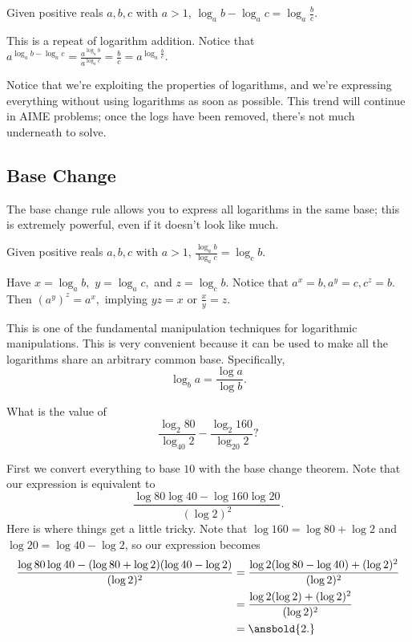 \begin{theo}
Given positive reals $a,b,c$ with $a > 1$, $\log_{a}b-\log_{a}c=\log_{a}{\frac{b}{c}}.$
\end{theo}

\begin{pro}
This is a repeat of logarithm addition. Notice that $a^{\log_ab-\log_ac}=\frac{a^{\log_ab}}{ a^{\log_ac}}=\frac{b}{c}=a^{\log_a\frac{b}{c}}.$
\end{pro}

Notice that we're exploiting the properties of logarithms, and we're expressing everything without using logarithms as soon as possible. This trend will continue in AIME problems; once the logs have been removed, there's not much underneath to solve.

\subsection{Base Change}
The base change rule allows you to express all logarithms in the same base; this is extremely powerful, even if it doesn't look like much.

\begin{theo}
Given positive reals $a,b,c$ with $a > 1$, $\frac{\log_{a}b}{\log_{a}c}=\log_{c}b.$
\end{theo}

\begin{pro}
Have $x=\log_ab,$ $y=\log_ac,$ and $z=\log_cb.$ Notice that $a^x=b,a^y=c,c^z=b.$ Then $(a^y)^z=a^x,$ implying $yz=x$ or $\frac{x}{y}=z.$
\end{pro}

This is one of the fundamental manipulation techniques for logarithmic manipulations. This is very convenient because it can be used to make all the logarithms share an arbitrary common base. Specifically,
\[\log_ba=\frac{\log a}{\log b}.\]

\begin{exam}[AMC 12B 2021/9]
What is the value of \[\frac{\log_2 80}{\log_{40}2}-\frac{\log_2 160}{\log_{20}2}?\]
\end{exam}

\begin{sol}
First we convert everything to base $10$ with the base change theorem. Note that our expression is equivalent to
\[\frac{\log 80\log 40 - \log 160\log 20}{(\log 2)^2}.\]
Here is where things get a little tricky. Note that $\log 160 = \log 80 + \log 2$ and $\log 20 = \log 40 - \log 2$, so our expression becomes
\begin{align*}
\frac{\log 80\log 40 - (\log 80+\log 2)(\log 40-\log 2)}{(\log 2)^2}&=\frac{\log 2(\log 80-\log 40)+(\log 2)^2}{(\log 2)^2} \\
&=\frac{\log 2(\log 2)+(\log 2)^2}{(\log 2)^2} \\
&=\ansbold{2.}
\end{align*}
\end{sol}

